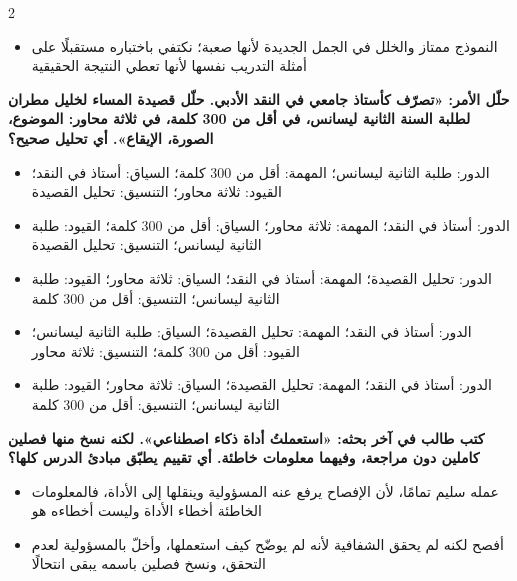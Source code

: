 \documentclass[10pt,a4paper]{article}
\begin{document}
\begin{multicols}{2}
\begin{minipage}{\linewidth}
\begin{itemize}[leftmargin=0.95cm, labelsep=4pt, itemsep=1pt, topsep=3pt, parsep=0pt]
  \item[\textbf{هـ)}] النموذج ممتاز والخلل في الجمل الجديدة لأنها صعبة؛ نكتفي باختباره مستقبلًا على أمثلة التدريب نفسها لأنها تعطي النتيجة الحقيقية
\end{itemize}
\end{minipage}\par\vspace{8pt plus 6pt}
\noindent\begin{minipage}{\linewidth}
\hangindent=0.7cm\textbf{حلّل الأمر: «تصرّف كأستاذ جامعي في النقد الأدبي. حلّل قصيدة المساء لخليل مطران لطلبة السنة الثانية ليسانس، في أقل من 300 كلمة، في ثلاثة محاور: الموضوع، الصورة، الإيقاع». أي تحليل صحيح؟}
\begin{itemize}[leftmargin=0.95cm, labelsep=4pt, itemsep=1pt, topsep=3pt, parsep=0pt]
  \item[\textbf{أ)}] الدور: طلبة الثانية ليسانس؛ المهمة: أقل من 300 كلمة؛ السياق: أستاذ في النقد؛ القيود: ثلاثة محاور؛ التنسيق: تحليل القصيدة
  \item[\textbf{ب)}] الدور: أستاذ في النقد؛ المهمة: ثلاثة محاور؛ السياق: أقل من 300 كلمة؛ القيود: طلبة الثانية ليسانس؛ التنسيق: تحليل القصيدة
  \item[\textbf{ج)}] الدور: تحليل القصيدة؛ المهمة: أستاذ في النقد؛ السياق: ثلاثة محاور؛ القيود: طلبة الثانية ليسانس؛ التنسيق: أقل من 300 كلمة
  \item[\textbf{د)}] الدور: أستاذ في النقد؛ المهمة: تحليل القصيدة؛ السياق: طلبة الثانية ليسانس؛ القيود: أقل من 300 كلمة؛ التنسيق: ثلاثة محاور
  \item[\textbf{هـ)}] الدور: أستاذ في النقد؛ المهمة: تحليل القصيدة؛ السياق: ثلاثة محاور؛ القيود: طلبة الثانية ليسانس؛ التنسيق: أقل من 300 كلمة
\end{itemize}
\end{minipage}\par\vspace{8pt plus 6pt}
\noindent\begin{minipage}{\linewidth}
\hangindent=0.7cm\textbf{كتب طالب في آخر بحثه: «استعملتُ أداة ذكاء اصطناعي». لكنه نسخ منها فصلين كاملين دون مراجعة، وفيهما معلومات خاطئة. أي تقييم يطبّق مبادئ الدرس كلها؟}
\begin{itemize}[leftmargin=0.95cm, labelsep=4pt, itemsep=1pt, topsep=3pt, parsep=0pt]
  \item[\textbf{أ)}] عمله سليم تمامًا، لأن الإفصاح يرفع عنه المسؤولية وينقلها إلى الأداة، فالمعلومات الخاطئة أخطاء الأداة وليست أخطاءه هو
  \item[\textbf{ب)}] أفصح لكنه لم يحقق الشفافية لأنه لم يوضّح كيف استعملها، وأخلّ بالمسؤولية لعدم التحقق، ونسخ فصلين باسمه يبقى انتحالًا

\end{itemize}
\end{minipage}
\end{multicols}
\end{document}

